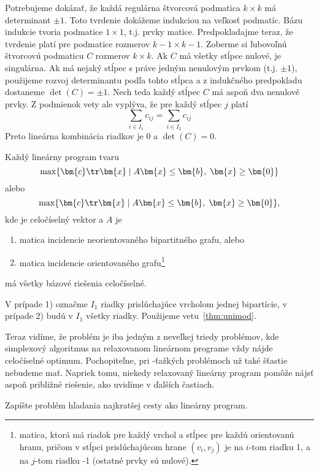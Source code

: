 \begin{dokaz}
  Potrebujeme dokázať, že každá regulárna štvorcová podmatica $k\times k$ má determinant $\pm1$. Toto tvrdenie
  dokážeme indukciou na veľkosť podmatíc. Bázu indukcie tvoria podmatice $1\times 1$, t.j. prvky matice.
  Predpokladajme teraz, že tvrdenie platí pre podmatice rozmerov $k-1\times k-1$. Zoberme si ľubovoľnú štvorcovú
  podmaticu $C$ rozmerov $k\times k$. Ak $C$ má všetky stĺpce nulové, je singulárna. Ak má nejaký stĺpec s práve jedným
  nenulovým prvkom (t.j. $\pm1$), použijeme rozvoj determinantu podľa tohto stĺpca a z indukčného predpokladu
  dostaneme $\det(C)=\pm1$. Nech teda každý stĺpec $C$ má aspoň dva nenulové prvky. Z podmienok vety ale vyplýva,
  že pre každý stĺpec $j$ platí 
  $$\sum\limits_{i\in I_1}c_{ij}=\sum\limits_{i\in I_2}c_{ij}$$
  Preto lineárna kombinácia riadkov je $0$ a $\det(C)=0$.
\end{dokaz}

\begin{dosl}
  Každý lineárny program tvaru $$\max\{\bm{c}\tr\bm{x}\mid A\bm{x}\le\bm{b},\;\bm{x}\ge\bm{0}\}$$ alebo
  $$\max\{\bm{c}\tr\bm{x}\mid A\bm{x}\le\bm{b},\;\bm{x}\ge\bm{0}\},$$ kde  je celočíselný vektor a $A$ je
   \begin{enumerate}
     \item matica incidencie neorientovaného bipartitného grafu, alebo
     \item matica incidencie orientovaného grafu\footnote{matica, ktorá má riadok pre každý vrchol a stĺpec pre každú orientovanú hranu, pričom v stĺpci prislúchajúcom hrane $(v_i,v_j)$ je
       na $i$-tom riadku 1, a na $j$-tom riadku -1 (ostatné prvky sú nulové).}
   \end{enumerate}
   má všetky bázové riešenia celočíselné.
\end{dosl}
\begin{dokaz}
  V prípade 1) označme $I_1$ riadky prislúchajúce vrcholom jednej bipartície, 
  v prípade 2) budú v $I_1$ všetky riadky. Použijeme vetu~\ref{thm:unimod}.
\end{dokaz}

\noindent
Teraz vidíme, že problém \maxWBmatching je iba jedným z neveľkej triedy problémov, kde simplexový algoritmus na relaxovanom
lineárnom programe vždy nájde celočíselné optimum. Pochopiteľne, pri \NP-ťažkých problémoch už také šťastie 
nebudeme mať. Napriek tomu, niekedy relaxovaný lineárny program pomôže nájsť aspoň približné riešenie, ako
uvidíme v ďalších častiach.

\begin{prob}
  Zapíšte problém hľadania najkratšej cesty ako lineárny program.
\end{prob}

